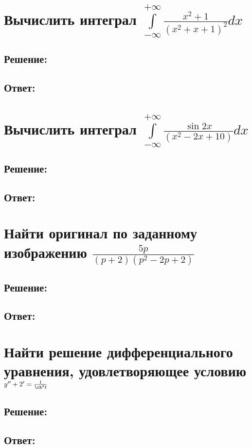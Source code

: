\documentclass{article}
\begin{document}
	\section{Вычислить интеграл $\int\limits_{-\infty}^{+\infty} \frac{x^2+1}{\left(x^2 + x + 1\right)^2}dx$}
	\subsection{Решение:}
	\subsection{Ответ:}
	
	\section{Вычислить интеграл $\int\limits_{-\infty}^{+\infty} \frac{\sin 2x}{\left(x^2 - 2x + 10\right)}dx$}
	\subsection{Решение:}
	\subsection{Ответ:}
	
	
	\section{Найти оригинал по заданному изображению $\frac{5p}{(p+2)(p^2-2p+2)}$}
	\subsection{Решение:}
	\subsection{Ответ:}
	\newpage
	\section{Найти решение дифференциального уравнения, удовлетворяющее условию $y'' + 2' = \frac{1}{\ch^2t}$}
	\subsection{Решение:}
	\subsection{Ответ:}
	
\end{document}

